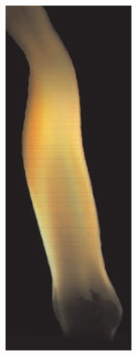 \begin{figure}[htpb!]
        \centering
        \begin{subfigure}[t]{0.106\textwidth}
                \includegraphics[width=\textwidth]{img/hasinoff_2003}

\end{subfigure}
\end{figure}
